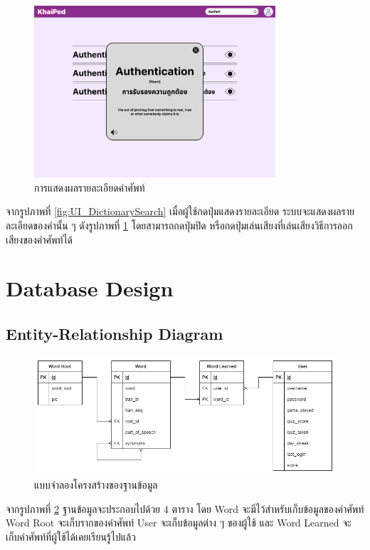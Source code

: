 \documentclass[12pt,oneside,openright,a4paper]{cpe-thai-project}
\begin{document}
\pagebreak
\begin{figure}[!h]\centering
	\includegraphics[width=0.8\textwidth, keepaspectratio=true]{image/chap3/ui/dict/Dictionary - View Word.png}
	\caption{การแสดงผลรายละเอียดคำศัพท์}\label{fig:UI_DictionaryView}
\end{figure}
\hspace{1cm}
จากรูปภาพที่ \ref{fig:UI_DictionarySearch} เมื่อผู้ใช้กดปุ่มแสดงรายละเอียด ระบบจะแสดงผลรายละเอียดของคำนั้น ๆ ดังรูปภาพที่ \ref{fig:UI_DictionaryView}
โดยสามารถกดปุ่มปิด หรือกดปุ่มเล่นเสียงที่เล่นเสียงวิธีการออกเสียงของคำศัพท์ได้

\pagebreak
\section{Database Design}
\subsection{Entity-Relationship Diagram} \label{ssec:DB}
\begin{figure}[!h]\centering
	\includegraphics[width=\textwidth, keepaspectratio=true]{image/chap3/ER diagrams.jpg}
	\caption{แบบจำลองโครงสร้างของฐานข้อมูล}\label{fig:ERDiagram}
\end{figure}
\hspace{1cm}
จากรูปภาพที่ \ref{fig:ERDiagram} ฐานข้อมูลจะประกอบไปด้วย 4 ตาราง โดย Word จะมีไว้สำหรับเก็บข้อมูลของคำศัพท์ Word Root
จะเก็บรากของคำศัพท์ User จะเก็บข้อมูลต่าง ๆ ของผู้ใช้ และ Word Learned จะเก็บคำศัพท์ที่ผู้ใช้ได้เคยเรียนรู้ไปแล้ว
\end{document}
